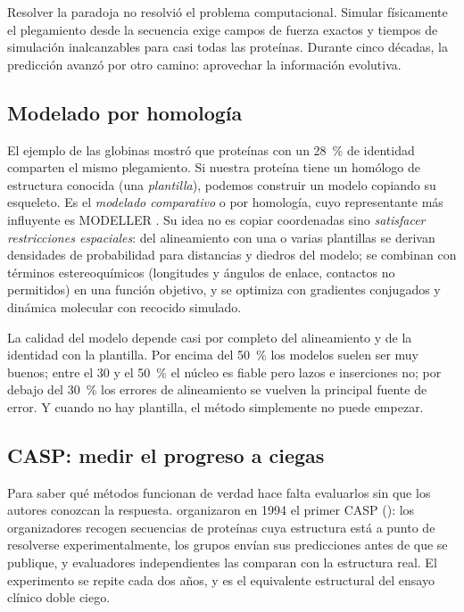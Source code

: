 Resolver la paradoja no resolvió el problema computacional. Simular físicamente el plegamiento desde la secuencia exige campos de fuerza exactos y tiempos de simulación inalcanzables para casi todas las proteínas. Durante cinco décadas, la predicción avanzó por otro camino: aprovechar la información evolutiva.

\subsection{Modelado por homología}

El ejemplo de las globinas mostró que proteínas con un \SI{28}{\percent} de identidad comparten el mismo plegamiento. Si nuestra proteína tiene un homólogo de estructura conocida (una \emph{plantilla}), podemos construir un modelo copiando su esqueleto. Es el \emph{modelado comparativo} o por homología, cuyo representante más influyente es MODELLER \parencite{c15-sali1993}. Su idea no es copiar coordenadas sino \emph{satisfacer restricciones espaciales}: del alineamiento con una o varias plantillas se derivan densidades de probabilidad para distancias y diedros del modelo; se combinan con términos estereoquímicos (longitudes y ángulos de enlace, contactos no permitidos) en una función objetivo, y se optimiza con gradientes conjugados y dinámica molecular con recocido simulado.

La calidad del modelo depende casi por completo del alineamiento y de la identidad con la plantilla. Por encima del \SI{50}{\percent} los modelos suelen ser muy buenos; entre el 30 y el \SI{50}{\percent} el núcleo es fiable pero lazos e inserciones no; por debajo del \SI{30}{\percent} los errores de alineamiento se vuelven la principal fuente de error. Y cuando no hay plantilla, el método simplemente no puede empezar.

\subsection{CASP: medir el progreso a ciegas}

Para saber qué métodos funcionan de verdad hace falta evaluarlos sin que los autores conozcan la respuesta. \textcite{c15-moult1995} organizaron en 1994 el primer CASP (): los organizadores recogen secuencias de proteínas cuya estructura está a punto de resolverse experimentalmente, los grupos envían sus predicciones antes de que se publique, y evaluadores independientes las comparan con la estructura real. El experimento se repite cada dos años, y es el equivalente estructural del ensayo clínico doble ciego.

